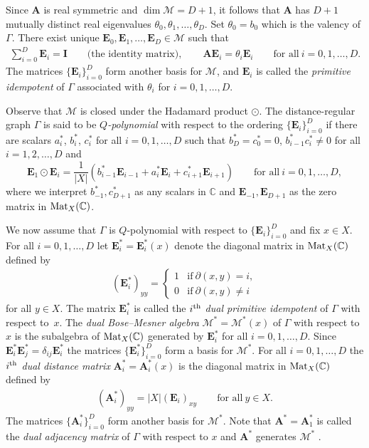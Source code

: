 \documentclass[10pt,a4paper]{amsart}
\def\A{\mathbf A}
\def\E{\mathbf E}
\def\C{\mathbb C}
\def\I{\mathbf I}
\def\Mat{{\rm Mat}}
\def\M{\mathcal M}
\numberwithin{equation}{section}
\begin{document}
Since $\A$ is real symmetric and $\dim \M=D+1$, it follows that $\A$ has $D+1$ mutually distinct real eigenvalues $\theta_0,\theta_1,\dots,\theta_D$. Set $\theta_0=b_0$ which is the valency of $\Gamma$.
There exist unique $\E_0,\E_1,\dots,\E_D\in \M$ such that
\begin{gather*}
\sum_{i=0}^D \E_i=\I\qquad \text{(the identity matrix)},
\qquad
\A \E_i=\theta_i \E_i\qquad
\text{for all}\ i=0,1,\dots,D.
\end{gather*}
The matrices $\{\E_i\}_{i=0}^D$ form another basis for $\M$, and $\E_i$ is called the {\it primitive idempotent} of $\Gamma$ associated with $\theta_i$ for $i=0,1,\dots,D$.

Observe that $\M$ is closed under the Hadamard product $\odot$. The distance-regular graph $\Gamma$ is said to be {\it $Q$-polynomial} with respect to the ordering $\{\E_i\}_{i=0}^D$ if there are scalars $a_i^*$, $b_i^*$, $c_i^*$ for all $i=0,1,\dots,D$ such that $b_D^*=c_0^*=0$, $b_{i-1}^*c_i^*\not=0$ for all $i=1,2,\dots,D$ and{\samepage
\[
\E_1\odot \E_i=\frac{1}{|X|}
(b_{i-1}^* \E_{i-1}+a_i^* \E_i+ c_{i+1}^* \E_{i+1})\qquad
\text{for all}\ i=0,1,\dots,D,
\]
where we interpret $b_{-1}^*, c_{D+1}^*$ as any scalars in $\C$ and $\E_{-1},\E_{D+1}$ as the zero matrix in $\Mat_X(\C)$.}

We now assume that $\Gamma$ is $Q$-polynomial with respect to $\{\E_i\}_{i=0}^D$ and fix $x\in X$. For all $i=0,1,\dots,D$ let $\E_i^*=\E_i^*(x)$ denote the diagonal matrix in $\Mat_X(\C)$ defined by
\begin{gather}\label{e:Ei*}
(\E_i^*)_{yy}=
\begin{cases}
1 &\text{if}\ \partial(x,y)=i,
\\
0 &\text{if}\ \partial(x,y)\not=i
\end{cases}
\end{gather}
for all $y\in X$. The matrix $\E_i^*$ is called the {\it $i^{\rm th}$ dual primitive idempotent} of $\Gamma$ with respect to~$x$. The {\it dual Bose--Mesner algebra} $\M^*=\M^*(x)$ of $\Gamma$ with respect to $x$ is the subalgebra of $\Mat_X(\C)$ generated by $\E_i^*$ for all $i=0,1,\dots,D$. Since $\E_i^*\E_j^*=\delta_{ij} \E_i^*$ the matrices $\{\E_i^*\}_{i=0}^D$ form a basis for $\M^*$. For all $i=0,1,\dots,D$ the {\it $i^{\rm th}$ dual distance matrix} $\A_i^*=\A_i^*(x)$ is the diagonal matrix in $\Mat_X(\C)$ defined by
\begin{gather}\label{e:Ai*}
(\A_i^*)_{yy}=|X| (\E_i)_{xy}\qquad
\text{for all}\ y\in X.
\end{gather}
The matrices $\{\A_i^*\}_{i=0}^D$ form another basis for $\M^*$. Note that $\A^*=\A_1^*$ is called the {\it dual adjacency matrix} of $\Gamma$ with respect to $x$ and $\A^*$ generates $\M^*$ \cite[Lemma~3.11]{TerAlgebraI}.
\end{document}

